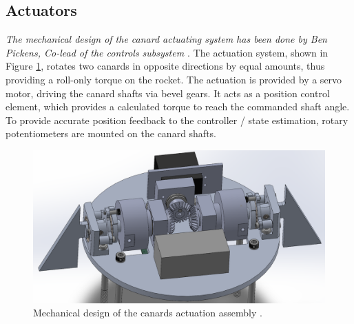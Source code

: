 

\subsection{Actuators}
\textit{The mechanical design of the canard actuating system has been done by Ben Pickens, Co-lead of the controls subsystem \cite{team-controls-ben}}.
The actuation system, shown in Figure \ref{fig:model-actuator-cad}, rotates two canards in opposite directions by equal amounts, thus providing a roll-only torque on the rocket.
The actuation is provided by a servo motor, driving the canard shafts via bevel gears.
It acts as a position control element, which provides a calculated torque to reach the commanded shaft angle. 
To provide accurate position feedback to the controller / state estimation, rotary potentiometers are mounted on the canard shafts.
\begin{figure}[ht]
    \centering
    \includegraphics[width=0.5\linewidth]{images-design/actuator_cad.png}
    \caption[Mechanical design of the actuator]{Mechanical design of the canards actuation assembly \cite{team-controls-ben}.}
    \label{fig:model-actuator-cad}
\end{figure}

